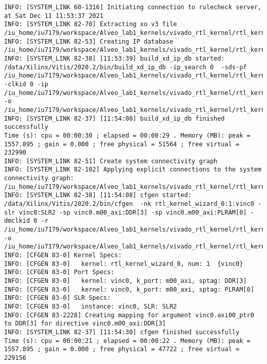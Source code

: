 \begin{lstlisting}[label=func,breaklines=true,breakatwhitespace=false,caption=СОДЕРЖИМОЕ LOG-ФАЙЛА.]
INFO: [SYSTEM_LINK 60-1316] Initiating connection to rulecheck server, at Sat Dec 11 11:53:37 2021
INFO: [SYSTEM_LINK 82-70] Extracting xo v3 file /iu_home/iu7179/workspace/Alveo_lab1_kernels/vivado_rtl_kernel/rtl_kernel_wizard_0_ex/exports/rtl_kernel_wizard_0.xo
INFO: [SYSTEM_LINK 82-53] Creating IP database /iu_home/iu7179/workspace/Alveo_lab1_kernels/vivado_rtl_kernel/rtl_kernel_wizard_0_ex/exports/_x/link/sys_link/_sysl/.cdb/xd_ip_db.xml
INFO: [SYSTEM_LINK 82-38] [11:53:39] build_xd_ip_db started: /data/Xilinx/Vitis/2020.2/bin/build_xd_ip_db -ip_search 0  -sds-pf /iu_home/iu7179/workspace/Alveo_lab1_kernels/vivado_rtl_kernel/rtl_kernel_wizard_0_ex/exports/_x/link/sys_link/xilinx_u200_xdma_201830_2.hpfm -clkid 0 -ip /iu_home/iu7179/workspace/Alveo_lab1_kernels/vivado_rtl_kernel/rtl_kernel_wizard_0_ex/exports/_x/link/sys_link/iprepo/mycompany_com_kernel_rtl_kernel_wizard_0_1_0,rtl_kernel_wizard_0 -o /iu_home/iu7179/workspace/Alveo_lab1_kernels/vivado_rtl_kernel/rtl_kernel_wizard_0_ex/exports/_x/link/sys_link/_sysl/.cdb/xd_ip_db.xml
INFO: [SYSTEM_LINK 82-37] [11:54:08] build_xd_ip_db finished successfully
Time (s): cpu = 00:00:30 ; elapsed = 00:00:29 . Memory (MB): peak = 1557.895 ; gain = 0.000 ; free physical = 51564 ; free virtual = 232990
INFO: [SYSTEM_LINK 82-51] Create system connectivity graph
INFO: [SYSTEM_LINK 82-102] Applying explicit connections to the system connectivity graph: /iu_home/iu7179/workspace/Alveo_lab1_kernels/vivado_rtl_kernel/rtl_kernel_wizard_0_ex/exports/_x/link/sys_link/cfgraph/cfgen_cfgraph.xml
INFO: [SYSTEM_LINK 82-38] [11:54:08] cfgen started: /data/Xilinx/Vitis/2020.2/bin/cfgen  -nk rtl_kernel_wizard_0:1:vinc0 -slr vinc0:SLR2 -sp vinc0.m00_axi:DDR[3] -sp vinc0.m00_axi:PLRAM[0] -dmclkid 0 -r /iu_home/iu7179/workspace/Alveo_lab1_kernels/vivado_rtl_kernel/rtl_kernel_wizard_0_ex/exports/_x/link/sys_link/_sysl/.cdb/xd_ip_db.xml -o /iu_home/iu7179/workspace/Alveo_lab1_kernels/vivado_rtl_kernel/rtl_kernel_wizard_0_ex/exports/_x/link/sys_link/cfgraph/cfgen_cfgraph.xml
INFO: [CFGEN 83-0] Kernel Specs: 
INFO: [CFGEN 83-0]   kernel: rtl_kernel_wizard_0, num: 1  {vinc0}
INFO: [CFGEN 83-0] Port Specs: 
INFO: [CFGEN 83-0]   kernel: vinc0, k_port: m00_axi, sptag: DDR[3]
INFO: [CFGEN 83-0]   kernel: vinc0, k_port: m00_axi, sptag: PLRAM[0]
INFO: [CFGEN 83-0] SLR Specs: 
INFO: [CFGEN 83-0]   instance: vinc0, SLR: SLR2
INFO: [CFGEN 83-2228] Creating mapping for argument vinc0.axi00_ptr0 to DDR[3] for directive vinc0.m00_axi:DDR[3]
INFO: [SYSTEM_LINK 82-37] [11:54:30] cfgen finished successfully
Time (s): cpu = 00:00:21 ; elapsed = 00:00:22 . Memory (MB): peak = 1557.895 ; gain = 0.000 ; free physical = 47722 ; free virtual = 229156

\end{lstlisting}

